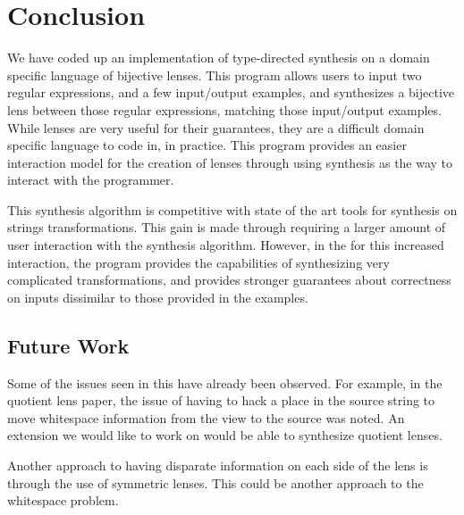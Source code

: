 \documentclass[numbers]{sigplanconf}
\begin{document}
\section{Conclusion}

We have coded up an implementation of type-directed synthesis on a domain
specific language of bijective lenses.  This program allows users to input two
regular expressions, and a few input/output examples, and synthesizes a
bijective lens between those regular expressions, matching those input/output
examples.  While lenses are very useful for their guarantees, they are a
difficult domain specific language to code in, in practice.  This program
provides an easier interaction model for the creation of lenses through using
synthesis as the way to interact with the programmer.

This synthesis algorithm is competitive with state of the art tools for
synthesis on strings transformations.  This gain is made through requiring a
larger amount of user interaction with the synthesis algorithm.  However, in the
for this increased interaction, the program provides the capabilities of
synthesizing very complicated transformations, and provides stronger guarantees
about correctness on inputs dissimilar to those provided in the examples.

\subsection{Future Work}
Some of the issues seen in this have already been observed.  For example, in the
quotient lens paper, the issue of having to hack a place in the source string to
move whitespace information from the view to the source was noted.  An extension
we would like to work on would be able to synthesize quotient lenses.

Another approach to having disparate information on each side of the lens is
through the use of symmetric lenses.  This could be another approach to the
whitespace problem.


\appendix

\ifanon\else
\acks 
\fi



\end{document}
